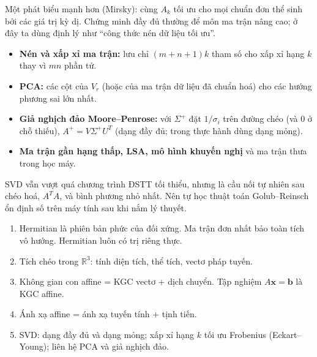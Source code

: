 \documentclass[12pt,a4paper]{article}
\begin{document}
\begin{luuy}
Một phát biểu mạnh hơn (Mirsky): cùng $A_k$ tối ưu cho mọi chuẩn đơn thể sinh bởi các giá trị kỳ dị. Chứng minh đầy đủ thường để môn ma trận nâng cao; ở đây ta dùng định lý như ``công thức nén dữ liệu tối ưu''.
\end{luuy}

\begin{ungdung}
\begin{itemize}
  \item \textbf{Nén và xấp xỉ ma trận:} lưu chỉ $(m+n+1)k$ tham số cho xấp xỉ hạng $k$ thay vì $mn$ phần tử.
  \item \textbf{PCA:} các cột của $V_r$ (hoặc của ma trận dữ liệu đã chuẩn hoá) cho các hướng phương sai lớn nhất.
  \item \textbf{Giả nghịch đảo Moore--Penrose:} với $\Sigma^+$ đặt $1/\sigma_i$ trên đường chéo (và $0$ ở chỗ thiếu), $A^+ = V \Sigma^+ U^T$ (dạng đầy đủ; trong thực hành dùng dạng mỏng).
  \item \textbf{Ma trận gần hạng thấp, LSA, mô hình khuyến nghị} và ma trận thưa trong học máy.
\end{itemize}
\end{ungdung}

\begin{luuy}
SVD vẫn vượt quá chương trình ĐSTT tối thiểu, nhưng là cầu nối tự nhiên sau chéo hoá, $A^T A$, và bình phương nhỏ nhất. Nên tự học thuật toán Golub--Reinsch ổn định số trên máy tính sau khi nắm lý thuyết.
\end{luuy}

\begin{tongket}[title={Tổng kết Phần XI}]
\begin{enumerate}
  \item Hermitian là phiên bản phức của đối xứng. Ma trận đơn nhất bảo toàn tích vô hướng. Hermitian luôn có trị riêng thực.
  \item Tích chéo trong $\mathbb{R}^3$: tính diện tích, thể tích, vectơ pháp tuyến.
  \item Không gian con affine = KGC vectơ + dịch chuyển. Tập nghiệm $A\mathbf{x} = \mathbf{b}$ là KGC affine.
  \item Ánh xạ affine = ánh xạ tuyến tính + tịnh tiến.
  \item SVD: dạng đầy đủ và dạng mỏng; xấp xỉ hạng $k$ tối ưu Frobenius (Eckart--Young); liên hệ PCA và giả nghịch đảo.
\end{enumerate}
\end{tongket}
\end{document}
